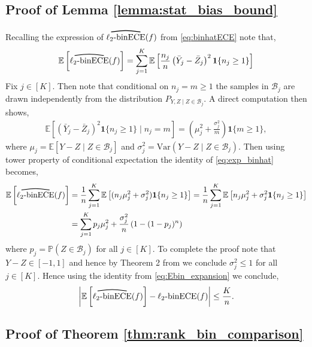 \documentclass[11pt]{article}
\numberwithin{equation}{section}
\theoremstyle{definition}
\newcommand{\E}{\mathbb{E}}
\renewcommand{\P}{\mathbb{P}}
\newcommand{\cB}{\mathcal{B}}
\newcommand{\one}{\bm{1}}
\newcommand{\myoverline}[2][3.5em]{%
  \overset{%
    \tikz[baseline=-0.1ex]{
      \draw[line width=0.75pt]
        (0,0) .. controls (#1/2,0.5ex) .. (#1,0);
    }%
  }{#2}%
}
\newcommand{\Var}{\mathrm{Var}}
\newcommand{\binECE}{\mathrm{binECE}}
\newcommand{\lbinECE}{\ell_2\textnormal{-}\binECE}
\newcommand{\binhatECE}{\myoverline{\lbinECE}}
\begin{document}
\subsection{Proof of Lemma \ref{lemma:stat_bias_bound}}\label{sec:proofof_lemma_stat_bias_bound}
Recalling the expression of $\binhatECE(f)$ from \eqref{eq:binhatECE} note that,
\begin{align}\label{eq:exp_binhat}
    \E\left[\binhatECE(f)\right] = \sum_{j=1}^{K}\E\left[\frac{n_j}{n}\left(\bar Y_j - \bar Z_j\right)^2\one\{n_j\geq 1\}\right]
\end{align}
Fix $j\in [K]$. Then note that conditional on $n_j = m\geq 1$ the samples in $\cB_j$ are drawn independently from the distribution $P_{Y,Z\mid Z\in \cB_j}$. A direct computation then shows,
\begin{align*}
    \E\left[\left(\bar Y_j - \bar Z_j\right)^2\one\{n_j\geq 1\}\mid n_j=m\right] = \left(\mu_j^2 + \frac{\sigma_j^2}{m}\right)\one\{m\geq 1\},
\end{align*}
where $\mu_j = \E[Y-Z\mid Z\in \cB_j]$ and $\sigma_j^2 = \Var\left(Y-Z\mid Z\in \cB_j\right)$. Then using tower property of conditional expectation the identity of \eqref{eq:exp_binhat} becomes,
\begin{align}\label{eq:Ebin_expansion}
    \E\left[\binhatECE(f)\right] 
    & = \frac{1}{n}\sum_{j=1}^{K}\E\left[(n_j\mu_j^2 + \sigma_j^2)\one\{n_j\geq 1\}\right] = \frac{1}{n}\sum_{j=1}^{K}\E\left[n_j\mu_j^2 + \sigma_j^2\one\{n_j\geq 1\}\right]\nonumber\\
    & = \sum_{j=1}^{K}p_j\mu_j^2 + \frac{\sigma_j^2}{n}\left(1-(1-p_j)^n\right)
\end{align}
where $p_j = \P(Z\in \cB_j)$ for all $j\in [K]$. To complete the proof note that $Y-Z\in [-1,1]$ and hence by Theorem 2 from \cite{bhatia2000better} we conclude $\sigma_j^2\leq 1$ for all $j\in [K]$. Hence using the identity from \eqref{eq:Ebin_expansion} we conclude,
\begin{align*}
    \left|\E\left[\binhatECE(f)\right] - \lbinECE(f)\right|\leq \frac{K}{n}.
\end{align*}

\subsection{Proof of Theorem \ref{thm:rank_bin_comparison}}\label{sec:proofof_thm_rank_bin_comparision}
\end{document}
